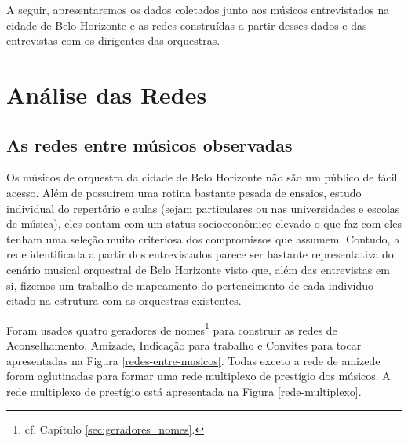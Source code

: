 \documentclass[a4paper, 12pt, openright, oneside, german, french, english, brazil]{abntex2}
\begin{document}
	A seguir, apresentaremos os dados coletados junto aos músicos entrevistados na cidade de Belo Horizonte e as redes construídas a partir desses dados e das entrevistas com os dirigentes das orquestras.
	
	
	
	\chapter{Análise das Redes}
	
	\section{As redes entre músicos observadas}
	
	
	Os músicos de orquestra da cidade de Belo Horizonte não são um público de fácil acesso. Além de possuírem uma rotina bastante pesada de ensaios, estudo individual do repertório e aulas (sejam particulares ou nas universidades e escolas de música), eles contam com um status socioeconômico elevado o que faz com eles tenham uma seleção muito criteriosa dos compromissos que assumem. Contudo, a rede identificada a partir dos entrevistados parece ser bastante representativa do cenário musical orquestral de Belo Horizonte visto que, além das entrevistas em si, fizemos um trabalho de mapeamento do pertencimento de cada indivíduo citado na estrutura com as orquestras existentes.
	
	Foram usados quatro geradores de nomes\footnote{cf. Capítulo \ref{sec:geradores_nomes}.} para construir as redes de Aconselhamento, Amizade, Indicação para trabalho e Convites para tocar apresentadas na Figura \ref{redes-entre-musicos}. 	Todas exceto a rede de amizede foram aglutinadas para formar uma rede multiplexo de prestígio dos músicos. A rede multiplexo de prestígio está apresentada na Figura \ref{rede-multiplexo}.
	
\end{document}
